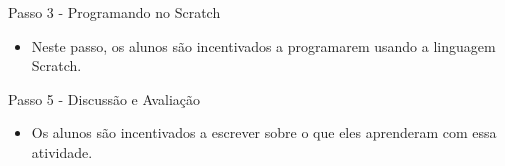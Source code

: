 \documentclass{beamer}
\begin{document}
\begin{frame}{Passo 3 - Programando no Scratch}

\begin{itemize}

\item Neste passo, os alunos são incentivados a programarem usando a linguagem Scratch.
\end{itemize}


\end{frame}



\begin{frame}{Passo 5 - Discussão e Avaliação}

\begin{itemize}

\item<1-> Os alunos são incentivados a escrever sobre o que eles aprenderam com essa atividade.

\end{itemize}


\end{frame}









\end{document}
